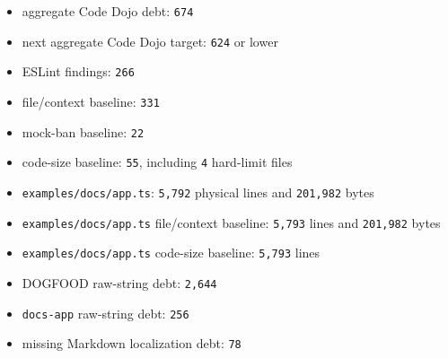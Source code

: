 \begin{itemize}
\tightlist
\item
  aggregate Code Dojo debt: \texttt{6\allowbreak{}7\allowbreak{}4}
\item
  next aggregate Code Dojo target: \texttt{6\allowbreak{}2\allowbreak{}4} or lower
\item
  ESLint findings: \texttt{2\allowbreak{}6\allowbreak{}6}
\item
  file/context baseline: \texttt{3\allowbreak{}3\allowbreak{}1}
\item
  mock-ban baseline: \texttt{2\allowbreak{}2}
\item
  code-size baseline: \texttt{5\allowbreak{}5}, including \texttt{4} hard-limit files
\item
  \texttt{e\allowbreak{}x\allowbreak{}a\allowbreak{}m\allowbreak{}p\allowbreak{}l\allowbreak{}e\allowbreak{}s\allowbreak{}/\allowbreak{}d\allowbreak{}o\allowbreak{}c\allowbreak{}s\allowbreak{}/\allowbreak{}a\allowbreak{}p\allowbreak{}p\allowbreak{}.\allowbreak{}t\allowbreak{}s}: \texttt{5\allowbreak{},\allowbreak{}7\allowbreak{}9\allowbreak{}2} physical lines and \texttt{2\allowbreak{}0\allowbreak{}1\allowbreak{},\allowbreak{}9\allowbreak{}8\allowbreak{}2} bytes
\item
  \texttt{e\allowbreak{}x\allowbreak{}a\allowbreak{}m\allowbreak{}p\allowbreak{}l\allowbreak{}e\allowbreak{}s\allowbreak{}/\allowbreak{}d\allowbreak{}o\allowbreak{}c\allowbreak{}s\allowbreak{}/\allowbreak{}a\allowbreak{}p\allowbreak{}p\allowbreak{}.\allowbreak{}t\allowbreak{}s} file/context baseline: \texttt{5\allowbreak{},\allowbreak{}7\allowbreak{}9\allowbreak{}3} lines and \texttt{2\allowbreak{}0\allowbreak{}1\allowbreak{},\allowbreak{}9\allowbreak{}8\allowbreak{}2} bytes
\item
  \texttt{e\allowbreak{}x\allowbreak{}a\allowbreak{}m\allowbreak{}p\allowbreak{}l\allowbreak{}e\allowbreak{}s\allowbreak{}/\allowbreak{}d\allowbreak{}o\allowbreak{}c\allowbreak{}s\allowbreak{}/\allowbreak{}a\allowbreak{}p\allowbreak{}p\allowbreak{}.\allowbreak{}t\allowbreak{}s} code-size baseline: \texttt{5\allowbreak{},\allowbreak{}7\allowbreak{}9\allowbreak{}3} lines
\item
  DOGFOOD raw-string debt: \texttt{2\allowbreak{},\allowbreak{}6\allowbreak{}4\allowbreak{}4}
\item
  \texttt{d\allowbreak{}o\allowbreak{}c\allowbreak{}s\allowbreak{}-\allowbreak{}a\allowbreak{}p\allowbreak{}p} raw-string debt: \texttt{2\allowbreak{}5\allowbreak{}6}
\item
  missing Markdown localization debt: \texttt{7\allowbreak{}8}
\end{itemize}

